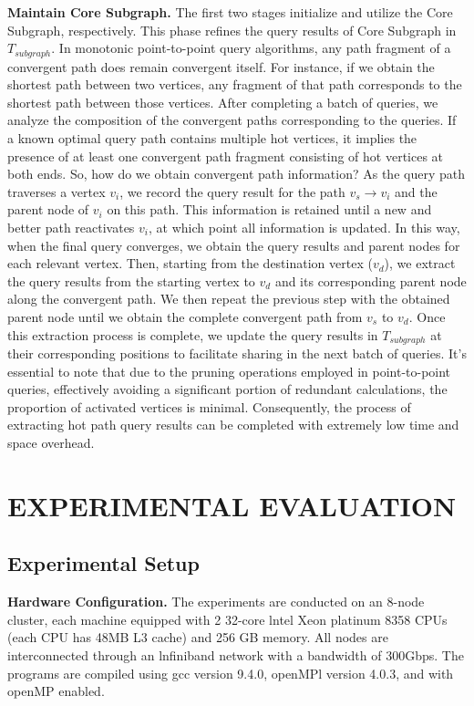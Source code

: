 \documentclass[10pt,journal,compsoc]{IEEEtran}
\begin{document}
{\bf{Maintain Core Subgraph.}} 
The first two stages initialize and utilize the Core Subgraph, respectively. This phase refines the query results of Core Subgraph in $T_{subgraph}$.
In monotonic point-to-point query algorithms, any path fragment of a convergent path does remain convergent itself. For instance, if we obtain the shortest path between two vertices, any fragment of that path corresponds to the shortest path between those vertices.
After completing a batch of queries, we analyze the composition of the convergent paths corresponding to the queries. If a known optimal query path contains multiple hot vertices, it implies the presence of at least one convergent path fragment consisting of hot vertices at both ends.
So, how do we obtain convergent path information? 
As the query path traverses a vertex $v_i$, we record the query result for the path $v_s\rightarrow v_i$ and the parent node of $v_i$ on this path. This information is retained until a new and better path reactivates $v_i$, at which point all information is updated. In this way, when the final query converges, we obtain the query results and parent nodes for each relevant vertex. 
Then, starting from the destination vertex ($v_d$), we extract the query results from the starting vertex to $v_d$ and its corresponding parent node along the convergent path. We then repeat the previous step with the obtained parent node until we obtain the complete convergent path from $v_s$ to $v_d$. Once this extraction process is complete, we update the query results in $T_{subgraph}$ at their corresponding positions to facilitate sharing in the next batch of queries.
It's essential to note that due to the pruning operations employed in point-to-point queries, effectively avoiding a significant portion of redundant calculations, the proportion of activated vertices is minimal. Consequently, the process of extracting hot path query results can be completed with extremely low time and space overhead.



\vspace{-8pt}
\section{EXPERIMENTAL EVALUATION}\label{experimental}

\vspace{-4pt}
\subsection{Experimental Setup}
{\bf{Hardware Configuration.}} The experiments are conducted on an 8-node cluster, each machine equipped with 2 32-core lntel Xeon platinum 8358 CPUs (each CPU has 48MB L3 cache) and 256 GB memory. All nodes are interconnected through an lnfiniband network with a bandwidth of 300Gbps. The programs are compiled using gcc version 9.4.0, openMPl version 4.0.3, and with openMP enabled.
\end{document}
